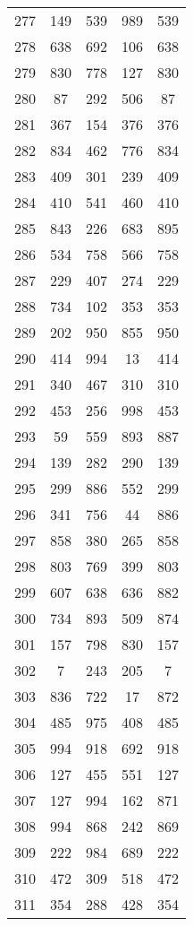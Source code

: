 \documentclass[a4paper,10pt,ngerman]{scrartcl}
\begin{document}
\begin{longtable}[c]{c|c|c|c|c}
    277 & 149 & 539 & 989 & 539 \\
    278 & 638 & 692 & 106 & 638 \\
    279 & 830 & 778 & 127 & 830 \\
    280 & 87 & 292 & 506 & 87 \\
    281 & 367 & 154 & 376 & 376 \\
    282 & 834 & 462 & 776 & 834 \\
    283 & 409 & 301 & 239 & 409 \\
    284 & 410 & 541 & 460 & 410 \\
    285 & 843 & 226 & 683 & 895 \\
    286 & 534 & 758 & 566 & 758 \\
    287 & 229 & 407 & 274 & 229 \\
    288 & 734 & 102 & 353 & 353 \\
    289 & 202 & 950 & 855 & 950 \\
    290 & 414 & 994 & 13 & 414 \\
    291 & 340 & 467 & 310 & 310 \\
    292 & 453 & 256 & 998 & 453 \\
    293 & 59 & 559 & 893 & 887 \\
    294 & 139 & 282 & 290 & 139 \\
    295 & 299 & 886 & 552 & 299 \\
    296 & 341 & 756 & 44 & 886 \\
    297 & 858 & 380 & 265 & 858 \\
    298 & 803 & 769 & 399 & 803 \\
    299 & 607 & 638 & 636 & 882 \\
    300 & 734 & 893 & 509 & 874 \\
    301 & 157 & 798 & 830 & 157 \\
    302 & 7 & 243 & 205 & 7 \\
    303 & 836 & 722 & 17 & 872 \\
    304 & 485 & 975 & 408 & 485 \\
    305 & 994 & 918 & 692 & 918 \\
    306 & 127 & 455 & 551 & 127 \\
    307 & 127 & 994 & 162 & 871 \\
    308 & 994 & 868 & 242 & 869 \\
    309 & 222 & 984 & 689 & 222 \\
    310 & 472 & 309 & 518 & 472 \\
    311 & 354 & 288 & 428 & 354 \\

\end{longtable}
\end{document}
